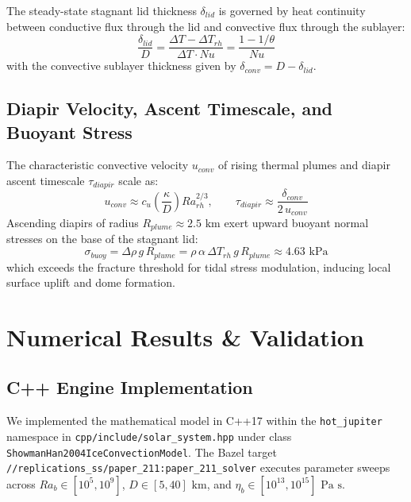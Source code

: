 \documentclass[11pt,a4paper]{article}
\begin{document}
The steady-state stagnant lid thickness $\delta_{lid}$ is governed by heat continuity between conductive flux through the lid and convective flux through the sublayer:
\begin{equation}
\frac{\delta_{lid}}{D} = \frac{\Delta T - \Delta T_{rh}}{\Delta T \cdot Nu} = \frac{1 - 1/\theta}{Nu}
\end{equation}
with the convective sublayer thickness given by $\delta_{conv} = D - \delta_{lid}$.

\subsection{Diapir Velocity, Ascent Timescale, and Buoyant Stress}
The characteristic convective velocity $u_{conv}$ of rising thermal plumes and diapir ascent timescale $\tau_{diapir}$ scale as:
\begin{equation}
u_{conv} \approx c_u \left(\frac{\kappa}{D}\right) Ra_{rh}^{2/3}, \qquad \tau_{diapir} \approx \frac{\delta_{conv}}{2\,u_{conv}}
\end{equation}
Ascending diapirs of radius $R_{plume} \approx 2.5\text{ km}$ exert upward buoyant normal stresses on the base of the stagnant lid:
\begin{equation}
\sigma_{buoy} = \Delta \rho\,g\,R_{plume} = \rho\,\alpha\,\Delta T_{rh}\,g\,R_{plume} \approx 4.63\text{ kPa}
\end{equation}
which exceeds the fracture threshold for tidal stress modulation, inducing local surface uplift and dome formation.

\section{Numerical Results \& Validation}

\subsection{C++ Engine Implementation}
We implemented the mathematical model in C++17 within the \texttt{hot\_jupiter} namespace in \texttt{cpp/include/solar\_system.hpp} under class \texttt{ShowmanHan2004IceConvectionModel}. The Bazel target \texttt{//replications\_ss/paper\_211:paper\_211\_solver} executes parameter sweeps across $Ra_b \in [10^5, 10^9]$, $D \in [5, 40]\text{ km}$, and $\eta_b \in [10^{13}, 10^{15}]\text{ Pa s}$.
\end{document}
